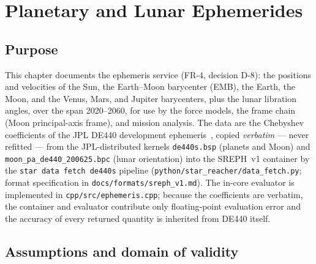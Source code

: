 \chapter{Planetary and Lunar Ephemerides}
\label{ch:ephemeris}

\section{Purpose}
\label{sec:ephemeris:purpose}

This chapter documents the ephemeris service (FR-4, decision D-8): the
positions and velocities of the Sun, the Earth--Moon barycenter (EMB), the
Earth, the Moon, and the Venus, Mars, and Jupiter barycenters, plus the
lunar libration angles, over the span 2020--2060, for use by the force
models, the frame chain (Moon principal-axis frame), and mission analysis.
The data are the Chebyshev coefficients of the JPL DE440 development
ephemeris~\cite{park2021}, copied \emph{verbatim} --- never refitted ---
from the JPL-distributed kernels \texttt{de440s.bsp} (planets and Moon) and
\texttt{moon\_pa\_de440\_200625.bpc} (lunar orientation) into the SREPH~v1
container by the \texttt{star data fetch de440s} pipeline
(\texttt{python/star\_reacher/data\_fetch.py}; format specification in
\texttt{docs/formats/sreph\_v1.md}). The in-core evaluator is implemented in
\texttt{cpp/src/ephemeris.cpp}; because the coefficients are verbatim, the
container and evaluator contribute only floating-point evaluation error and
the accuracy of every returned quantity is inherited from DE440 itself.

\section{Assumptions and domain of validity}
\label{sec:ephemeris:domain}

